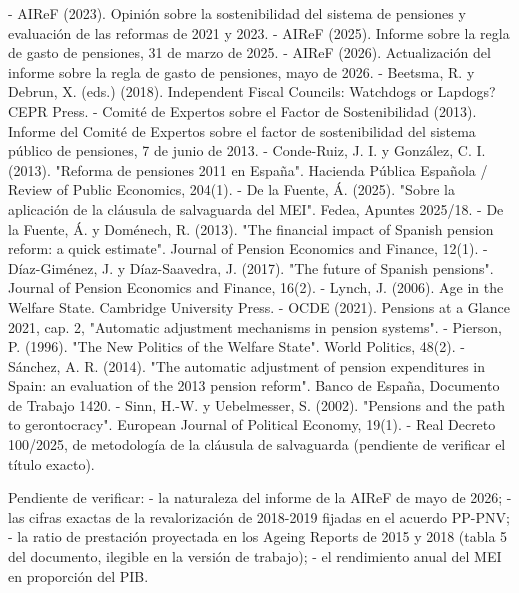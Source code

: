 \documentclass[10pt,a4paper]{article}
\begin{document}
- AIReF (2023). Opinión sobre la sostenibilidad del sistema de pensiones y evaluación de las reformas de 2021 y 2023.
- AIReF (2025). Informe sobre la regla de gasto de pensiones, 31 de marzo de 2025.
- AIReF (2026). Actualización del informe sobre la regla de gasto de pensiones, mayo de 2026.
- Beetsma, R. y Debrun, X. (eds.) (2018). Independent Fiscal Councils: Watchdogs or Lapdogs? CEPR Press.
- Comité de Expertos sobre el Factor de Sostenibilidad (2013). Informe del Comité de Expertos sobre el factor de sostenibilidad del sistema público de pensiones, 7 de junio de 2013.
- Conde-Ruiz, J. I. y González, C. I. (2013). "Reforma de pensiones 2011 en España". Hacienda Pública Española / Review of Public Economics, 204(1).
- De la Fuente, Á. (2025). "Sobre la aplicación de la cláusula de salvaguarda del MEI". Fedea, Apuntes 2025/18.
- De la Fuente, Á. y Doménech, R. (2013). "The financial impact of Spanish pension reform: a quick estimate". Journal of Pension Economics and Finance, 12(1).
- Díaz-Giménez, J. y Díaz-Saavedra, J. (2017). "The future of Spanish pensions". Journal of Pension Economics and Finance, 16(2).
- Lynch, J. (2006). Age in the Welfare State. Cambridge University Press.
- OCDE (2021). Pensions at a Glance 2021, cap. 2, "Automatic adjustment mechanisms in pension systems".
- Pierson, P. (1996). "The New Politics of the Welfare State". World Politics, 48(2).
- Sánchez, A. R. (2014). "The automatic adjustment of pension expenditures in Spain: an evaluation of the 2013 pension reform". Banco de España, Documento de Trabajo 1420.
- Sinn, H.-W. y Uebelmesser, S. (2002). "Pensions and the path to gerontocracy". European Journal of Political Economy, 19(1).
- Real Decreto 100/2025, de metodología de la cláusula de salvaguarda (pendiente de verificar el título exacto).

Pendiente de verificar:
- la naturaleza del informe de la AIReF de mayo de 2026;
- las cifras exactas de la revalorización de 2018-2019 fijadas en el acuerdo PP-PNV;
- la ratio de prestación proyectada en los Ageing Reports de 2015 y 2018 (tabla 5 del documento, ilegible en la versión de trabajo);
- el rendimiento anual del MEI en proporción del PIB.
\end{document}
